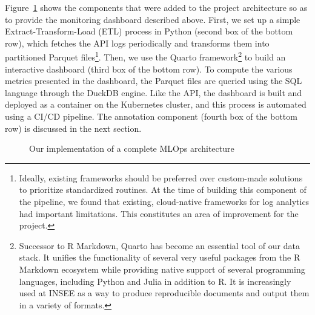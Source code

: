 \documentclass[graybox]{svmult}
\begin{document}
Figure~\ref{fig:full-architecture} shows the components that were added to the project architecture so as to provide the monitoring dashboard described above. First, we set up a simple Extract-Transform-Load (ETL) process in Python (second box of the bottom row), which fetches the API logs periodically and transforms them into partitioned Parquet files\footnote{Ideally, existing frameworks should be preferred over custom-made solutions to prioritize standardized routines. At the time of building this component of the pipeline, we found that existing, cloud-native frameworks for log analytics had important limitations. This constitutes an area of improvement for the project.}. Then, we use the Quarto framework\footnote{Successor to R Markdown, Quarto has become an essential tool of our data stack. It unifies the functionality of several very useful packages from the R Markdown ecosystem while providing native support of several programming languages, including Python and Julia in addition to R. It is increasingly used at INSEE as a way to produce reproducible documents and output them in a variety of formats.} to build an interactive dashboard (third box of the bottom row). To compute the various metrics presented in the dashboard, the Parquet files are queried using the SQL language through the DuckDB engine. Like the API, the dashboard is built and deployed as a container on the Kubernetes cluster, and this process is automated using a CI/CD pipeline. The annotation component (fourth box of the bottom row) is discussed in the next section.

\begin{figure}[htbp]
    \centering
    \caption{Our implementation of a complete MLOps architecture}
    \label{fig:full-architecture}
\end{figure}
\end{document}
